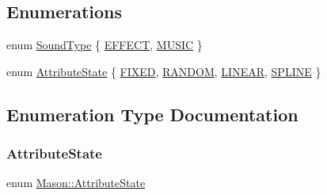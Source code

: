 \subsection*{Enumerations}
\begin{DoxyCompactItemize}
\item 
enum \hyperlink{namespace_mason_a158d651086d1ba1aacc4c37125b27657}{Sound\+Type} \{ \hyperlink{namespace_mason_a158d651086d1ba1aacc4c37125b27657a3ee843ce73fc06de504eb1480c65c82f}{E\+F\+F\+E\+CT}, 
\hyperlink{namespace_mason_a158d651086d1ba1aacc4c37125b27657aed96b5a2149aa99cd63db202531798a2}{M\+U\+S\+IC}
 \}
\item 
enum \hyperlink{namespace_mason_aefc2ce7d9295b57af46ab6c8ebfc32f7}{Attribute\+State} \{ \hyperlink{namespace_mason_aefc2ce7d9295b57af46ab6c8ebfc32f7a9f895fa38383fdd4d8ff3a0e62f6829a}{F\+I\+X\+ED}, 
\hyperlink{namespace_mason_aefc2ce7d9295b57af46ab6c8ebfc32f7a7ffd1f43455324cb476f193c685042cc}{R\+A\+N\+D\+OM}, 
\hyperlink{namespace_mason_aefc2ce7d9295b57af46ab6c8ebfc32f7adc1ccb7eb1ce06e416232c706f0b3e93}{L\+I\+N\+E\+AR}, 
\hyperlink{namespace_mason_aefc2ce7d9295b57af46ab6c8ebfc32f7a279e070d018a6126a336f0f28185ecdf}{S\+P\+L\+I\+NE}
 \}
\end{DoxyCompactItemize}


\subsection{Enumeration Type Documentation}
\hypertarget{namespace_mason_aefc2ce7d9295b57af46ab6c8ebfc32f7}{}\label{namespace_mason_aefc2ce7d9295b57af46ab6c8ebfc32f7} 
\subsubsection{\texorpdfstring{Attribute\+State}{AttributeState}}
{\footnotesize\ttfamily enum \hyperlink{namespace_mason_aefc2ce7d9295b57af46ab6c8ebfc32f7}{Mason\+::\+Attribute\+State}}

